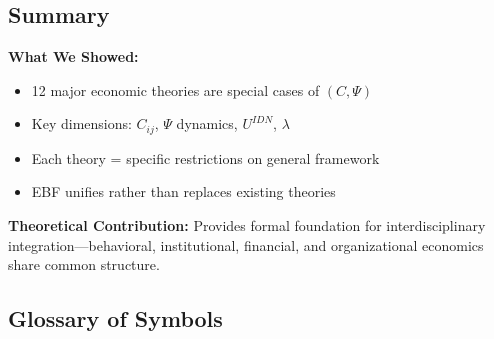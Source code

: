 

\subsection{Summary}
\label{sec:A-summary}

\begin{tcolorbox}[colback=blue!5!white, colframe=blue!75!black,
    title=\textbf{Summary: Limiting Cases}]

\textbf{What We Showed:}
\begin{itemize}[nosep]
    \item 12 major economic theories are special cases of $(C, \Psi)$
    \item Key dimensions: $C_{ij}$, $\Psi$ dynamics, $U^{IDN}$, $\lambda$
    \item Each theory = specific restrictions on general framework
    \item EBF unifies rather than replaces existing theories
\end{itemize}

\textbf{Theoretical Contribution:}
Provides formal foundation for interdisciplinary integration---behavioral,
institutional, financial, and organizational economics share common structure.

\end{tcolorbox}


\subsection{Glossary of Symbols}
\label{sec:A-glossary}

